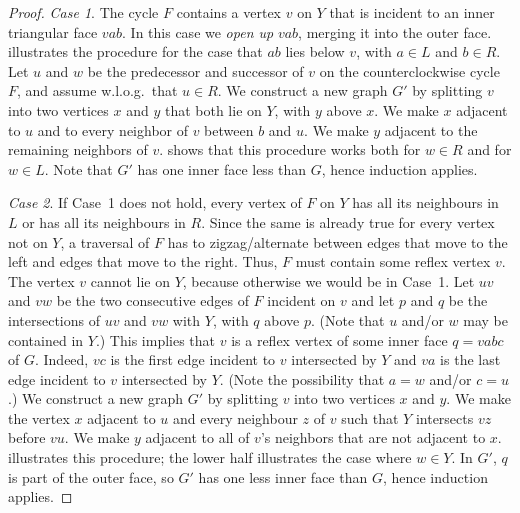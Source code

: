 \begin{proof}
	{\em Case 1}. The cycle $F$ contains a vertex $v$ on $Y$ that is incident to an inner triangular face $vab$. In this case
        we \emph{open up} $vab$, merging it into the outer face.  illustrates the procedure for the case that $ab$ lies below $v$, with $a\in L$ and $b\in R$. Let $u$ and $w$ be the predecessor and successor of $v$ on the
	counterclockwise cycle $F$, and assume w.l.o.g.\ that $u\in R$.
	We construct a new graph $G'$ by splitting $v$ into two vertices $x$
	and $y$ that both lie on $Y$, with $y$ above $x$. We make $x$ adjacent to $u$ and to every neighbor of $v$ between $b$ and $u$.
	We make $y$ adjacent to the remaining neighbors of $v$.
	 shows that this procedure works both for $w\in R$
	and for $w\in L$. Note that $G'$ has one inner face less than $G$, hence induction applies.
		
	
	{\em Case 2}. If Case~1 does not hold,
%	
%	
        every vertex of $F$ on $Y$ has all its neighbours
	in $L$ or has all its neighbours in $R$.  Since the same is already true for every vertex not on $Y$, a traversal of $F$ has to zigzag/alternate between edges that move to the left and edges that move to the right.  Thus, $F$ must contain some reflex vertex $v$.  The vertex $v$ cannot lie on $Y$, because otherwise we would be in Case~1.  Let $uv$ and $vw$ be the two consecutive edges of $F$ incident on $v$ and let $p$ and $q$ be the intersections of $uv$ and $vw$ with $Y$, with $q$ above $p$.	
	(Note that $u$ and/or $w$ may be contained in $Y$.)
	This implies that $v$ is a reflex vertex of some inner face
	$q=vabc$ of $G$.  Indeed, $vc$ is the first edge incident
	to $v$ intersected by $Y$ and $va$ is the last edge incident
	to $v$ intersected by $Y$. (Note the possibility that $a=w$
	and/or $c=u$.)	We construct a new graph $G'$ by splitting
	$v$ into two vertices $x$ and $y$. We make the vertex $x$
	adjacent to $u$ and every neighbour $z$ of $v$ such that $Y$
	intersects $vz$ before $vu$.  We make $y$ adjacent to all of
	$v$'s neighbors that are not adjacent to $x$.  
	illustrates this procedure; the lower half illustrates the case
	where $w\in Y$. In $G'$, $q$ is part of the outer face, so $G'$
	has one less inner face than $G$, hence induction applies.


\end{proof}
